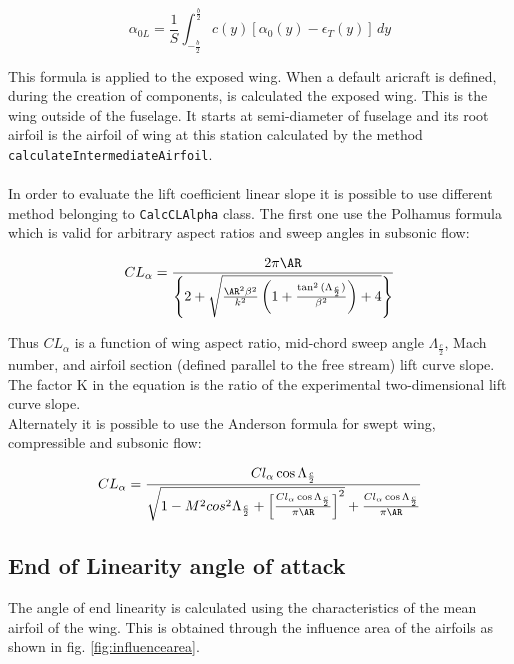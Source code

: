 \begin{equation}
\alpha_{0L} = \frac{1}{S}\int_{-\frac{b}{2}}^{\frac{b}{2}} c(y) [ \alpha_0(y) - \epsilon_T(y) ] \, dy
\end{equation}

This formula  is applied to the exposed wing. When a default aricraft is defined, during the creation of components, is calculated the exposed wing. This is the wing outside of the fuselage. It starts at semi-diameter of fuselage and its root airfoil is the airfoil of wing  at this station calculated by the method \texttt{calculateIntermediateAirfoil}.\\ \\

In order to evaluate the lift coefficient linear slope  it is possible to use different method belonging to \texttt{CalcCLAlpha} class. The first one use the Polhamus formula which is valid for arbitrary aspect ratios and sweep angles in subsonic flow:

\begin{equation}
CL_{\alpha} = \frac{2 \pi \AR}{ \left\{ 2 + \sqrt{\frac{\AR^2 \beta^2}{k^2} \left ( 1 + \frac{\tan^2{(\Lambda_{\frac{c}{2}})}}{\beta^2} \right) + 4 }\right\}}
\end{equation}

Thus $CL_{\alpha}$  is a function of wing aspect ratio, mid-chord sweep angle $\Lambda_{\frac{c}{2}}$, Mach number, and airfoil section (defined parallel to the free stream) lift curve slope. The factor K in the equation is the ratio of the experimental two-dimensional lift curve slope.\\
Alternately it is possible to use the Anderson formula for swept wing, compressible and subsonic flow:

\begin{equation}
CL_{\alpha} = 
\frac{Cl_{\alpha} \cos{\Lambda_{\frac{c}{2}}}}
{\sqrt{1 - M^2  cos^2 {\Lambda_{\frac{c}{2}}}
 + \left[ \frac{Cl_{\alpha} \cos{\Lambda_{\frac{c}{2}}}}{\pi \AR}\right]^2} + \frac{Cl_{\alpha} \cos{\Lambda_{\frac{c}{2}}}}{\pi \AR}}
\end{equation}



\subsection{End of Linearity angle of attack}

The angle of end linearity is calculated using the characteristics of the mean airfoil of the wing. This is obtained through the influence area of the airfoils as shown in fig. \ref{fig:influencearea}.

